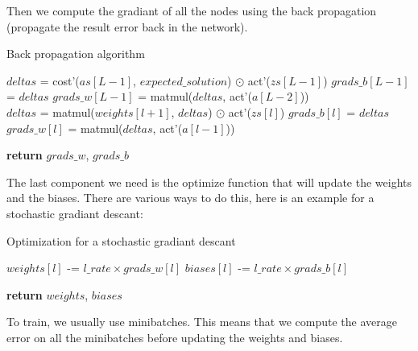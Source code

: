 \documentclass[a4paper]{article}
\begin{document}
Then we compute the gradiant of all the nodes using the back propagation
(propagate the result error back in the network).

\begin{algorithm}
  \caption{Back propagation algorithm}
  \begin{algorithmic}
      \State $deltas$ = cost'($as[L - 1]$, $expected\_solution$) $\odot$ act'($zs[L - 1]$)
      \State $grads\_b[L - 1]$ = $deltas$
      \State $grads\_w[L - 1]$ = matmul($deltas$, act'($a[L - 2]$)) \\

        \State $deltas$ = matmul($weights[l + 1]$, $deltas$) $\odot$ act'($zs[l]$)
        \State $grads\_b[l]$ = $deltas$
        \State $grads\_w[l]$ = matmul($deltas$, act'($a[l - 1]$))
      \EndFor

      \State \textbf{return} $grads\_w$, $grads\_b$
    \EndProcedure
  \end{algorithmic}
\end{algorithm}

The last component we need is the optimize function that will update the weights
and the biases. There are various ways to do this, here is an example for a
stochastic gradiant descant:

\begin{algorithm}
  \caption{Optimization for a stochastic gradiant descant}
  \begin{algorithmic}
        \State $weights[l]$ -= $l\_rate \times grads\_w[l]$
        \State $biases[l]$ -= $l\_rate \times grads\_b[l]$
      \EndFor

      \State \textbf{return} $weights$, $biases$
    \EndProcedure
  \end{algorithmic}
\end{algorithm}

To train, we usually use minibatches. This means that we compute the average
error on all the minibatches before updating the weights and biases.
\end{document}
